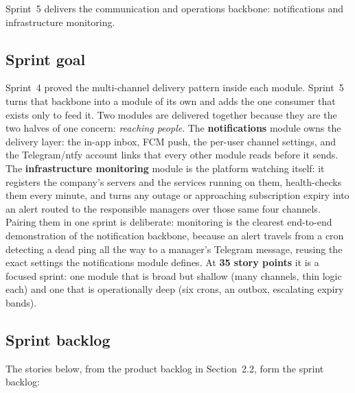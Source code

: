 Sprint~5 delivers the communication and operations backbone: notifications and infrastructure
monitoring.

\subsection{Sprint goal}

Sprint~4 proved the multi-channel delivery pattern inside each module. Sprint~5 turns that
backbone into a module of its own and adds the one consumer that exists only to
feed it. Two modules are delivered together because they are the two halves of one concern:
\emph{reaching people}. The \textbf{notifications} module owns the delivery layer: the
in-app inbox, FCM push, the per-user channel settings, and the Telegram/ntfy account links
that every other module reads before it sends. The \textbf{infrastructure monitoring} module
is the platform watching itself: it registers the company's servers and the services running
on them, health-checks them every minute, and turns any outage or approaching subscription
expiry into an alert routed to the responsible managers over those same four channels. Pairing
them in one sprint is deliberate: monitoring is the clearest end-to-end demonstration of the
notification backbone, because an alert travels from a cron detecting a dead ping all the way
to a manager's Telegram message, reusing the exact settings the notifications module defines.
At \textbf{35 story points} it is a focused sprint: one module that is broad but shallow (many
channels, thin logic each) and one that is operationally deep (six crons, an outbox,
escalating expiry bands).

\subsection{Sprint backlog}

The stories below, from the product backlog in Section~2.2, form the sprint backlog:

